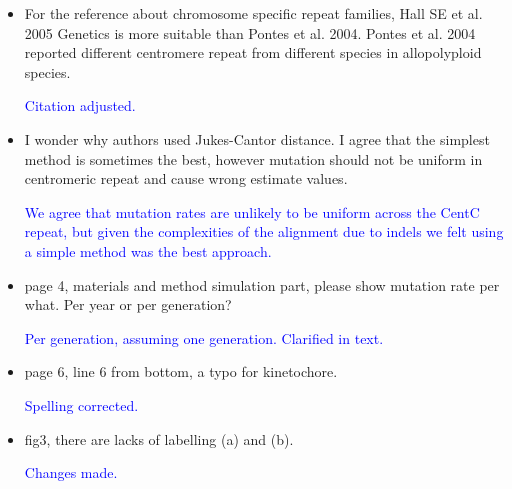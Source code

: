 \documentclass[]{article}
\newcommand{\res}[1]{\noindent \textcolor{blue}{{#1}} \\}
\begin{document}
\begin{itemize}
\item For the reference about chromosome specific repeat families, Hall SE et al. 2005 Genetics is more suitable than Pontes et al. 2004. Pontes et al. 2004 reported different centromere repeat from different species in allopolyploid species.

\res{Citation adjusted.}

\item I wonder why authors used Jukes-Cantor distance. I agree that the simplest method is sometimes the best, however mutation should not be uniform in centromeric repeat and cause wrong estimate values. 

\res{We agree that mutation rates are unlikely to be uniform across the CentC repeat, but given the complexities of the alignment due to indels we felt using a simple method was the best approach. }

\item page 4, materials and method simulation part, please show mutation rate per what. Per year or per generation? 

\res{Per generation, assuming one generation.  Clarified in text.}

\item page 6, line 6 from bottom, a typo for kinetochore.

\res{Spelling corrected.}

\item fig3, there are lacks of labelling (a) and (b). 

\res{Changes made.}

\end{itemize}
\end{document}
